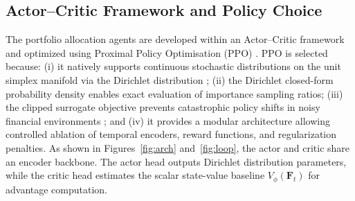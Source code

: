 \documentclass[11pt,a4paper]{article}
\numberwithin{equation}{section}
\numberwithin{table}{section}
\numberwithin{figure}{section}
\numberwithin{algorithm}{section}
\newcommand{\F}{\mathbf{F}}
\begin{document}
\subsection{Actor--Critic Framework and Policy Choice}
The portfolio allocation agents are developed within an Actor--Critic framework and optimized using Proximal Policy Optimisation (PPO) \cite{schulman2017}. PPO is selected because: (i) it natively supports continuous stochastic distributions on the unit simplex manifold via the Dirichlet distribution \cite{yang2022}; (ii) the Dirichlet closed-form probability density enables exact evaluation of importance sampling ratios; (iii) the clipped surrogate objective prevents catastrophic policy shifts in noisy financial environments \cite{schulman2017}; and (iv) it provides a modular architecture allowing controlled ablation of temporal encoders, reward functions, and regularization penalties. As shown in Figures~\ref{fig:arch} and~\ref{fig:loop}, the actor and critic share an encoder backbone. The actor head outputs Dirichlet distribution parameters, while the critic head estimates the scalar state-value baseline $V_\phi(\F_t)$ for advantage computation.
\end{document}
